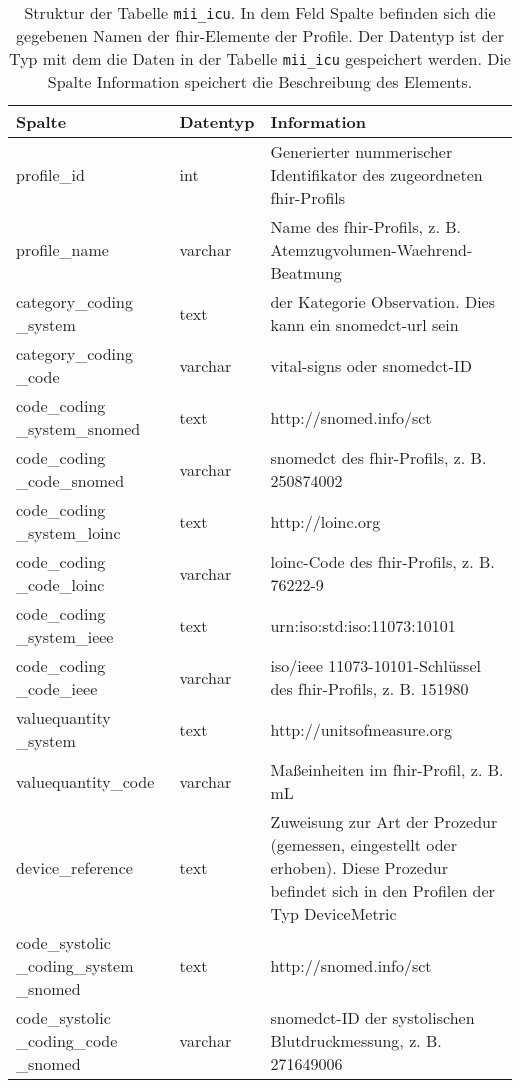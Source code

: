 \begin{longtable}{|p{3.5cm}|l|p{6.7cm}|}
	\caption[Struktur der Tabelle mii\_icu]{Struktur der Tabelle \texttt{mii\_icu}. In dem Feld Spalte befinden sich die gegebenen Namen der \ac{fhir}-Elemente der Profile. Der Datentyp ist der Typ mit dem die Daten in der Tabelle \texttt{mii\_icu} gespeichert werden. Die Spalte Information speichert die Beschreibung des Elements.} \label{tab:miiicu}
	\endfirsthead
		\hline
		\bfseries Spalte & \bfseries Datentyp & \bfseries Information \\ \hline
		profile\_id & int & Generierter nummerischer Identifikator des zugeordneten \ac{fhir}-Profils \\ \hline
		profile\_name & varchar & Name des \ac{fhir}-Profils, z. B. Atemzugvolumen-Waehrend-Beatmung \\ \hline
		category\_coding \_system & text & \acsu{url} der Kategorie \glqq Observation\grqq{}. Dies kann ein \ac{snomedct}-\ac{url} sein \\ \hline
		category\_coding \_code & varchar & \glqq vital-signs\grqq{} oder \ac{snomedct}-ID \\ \hline
		code\_coding \_system\_snomed & text & http://snomed.info/sct \\ \hline 
		code\_coding \_code\_snomed & varchar & \ac{snomedct} des \ac{fhir}-Profils, z. B. 250874002 \\ \hline
		code\_coding \_system\_loinc & text & http://loinc.org \\ \hline
		code\_coding \_code\_loinc & varchar & \ac{loinc}-Code des \ac{fhir}-Profils, z. B. 76222-9 \\ \hline
		code\_coding \_system\_ieee & text & urn:iso:std:iso:11073:10101 \\ \hline
		code\_coding \_code\_ieee & varchar & \ac{iso}/\ac{ieee} 11073-10101\texttrademark{}-Schlüssel des \ac{fhir}-Profils, z. B. 151980 \\ \hline
		valuequantity \_system & text & http://unitsofmeasure.org \\ \hline
		valuequantity\_code & varchar & Maßeinheiten im \ac{fhir}-Profil, z. B. mL \\ \hline
		device\_reference & text & Zuweisung zur Art der Prozedur (gemessen, eingestellt oder erhoben). Diese Prozedur befindet sich in den Profilen der Typ \glqq DeviceMetric\grqq{} \\ \hline
		code\_systolic \_coding\_system \_snomed & text & http://snomed.info/sct \\ \hline
		code\_systolic \_coding\_code \_snomed & varchar & \ac{snomedct}-ID der systolischen Blutdruckmessung, z. B. 271649006 \\ \hline

\end{longtable}
